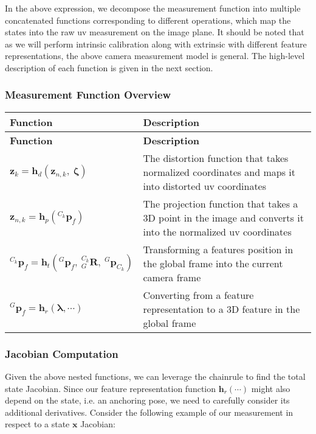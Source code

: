In the above expression, we decompose the measurement function into multiple concatenated functions corresponding to different operations, which map the states into the raw uv measurement on the image plane. It should be noted that as we will perform intrinsic calibration along with extrinsic with different feature representations, the above camera measurement model is general. The high-\/level description of each function is given in the next section.\hypertarget{update-feat_model-table}{}\subsubsection{Measurement Function Overview}\label{update-feat_model-table}
\tabulinesep=1mm
\begin{longtabu} spread 0pt [c]{*{2}{|X[-1]}|}
\hline
\rowcolor{\tableheadbgcolor}\textbf{ Function }&\textbf{ Description  }\\
\endfirsthead
\hline
\endfoot
\hline
\rowcolor{\tableheadbgcolor}\textbf{ Function }&\textbf{ Description  }\\
\endhead
$\mathbf{z}_k = \mathbf h_d (\mathbf{z}_{n,k}, ~\boldsymbol\zeta)$ &The distortion function that takes normalized coordinates and maps it into distorted uv coordinates \\
$\mathbf{z}_{n,k}= \mathbf h_p({}^{C_k}\mathbf{p}_f)$&The projection function that takes a 3D point in the image and converts it into the normalized uv coordinates \\
${}^{C_k}\mathbf{p}_f=\mathbf h_t({}^{G}\mathbf{p}_f,~{}^{C_k}_{G}\mathbf{R},~{}^{G}\mathbf{p}_{C_k})$ &Transforming a feature\textquotesingle{}s position in the global frame into the current camera frame \\
${}^{G}\mathbf{p}_f= \mathbf h_r(\boldsymbol\lambda,\cdots)$ &Converting from a feature representation to a 3D feature in the global frame \\
\end{longtabu}
\hypertarget{update-feat_model-deriv}{}\subsubsection{Jacobian Computation}\label{update-feat_model-deriv}
Given the above nested functions, we can leverage the chainrule to find the total state Jacobian. Since our feature representation function $\mathbf h_r(\cdots)$ might also depend on the state, i.\+e. an anchoring pose, we need to carefully consider its additional derivatives. Consider the following example of our measurement in respect to a state $ \mathbf{x} $ Jacobian\+:

